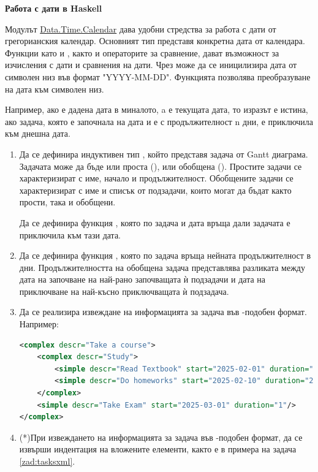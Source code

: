 \begin{mdframed}[hidealllines=true,backgroundcolor=gray!20]
\textbf{Работа с дати в Haskell}

Модулът \href{https://hackage.haskell.org/package/time-1.14/docs/Data-Time-Calendar.html}{Data.Time.Calendar} дава удобни стредства за работа с дати от грегорианския календар. Основният тип  представя конкретна дата от календара. Функции като  и , както и операторите за сравнение, дават възможност за изчисления с дати и сравнения на дати. Чрез  може да се иницилизира дата от символен низ във формат "YYYY-MM-DD". Функцията  позволява преобразуване на дата към символен низ.


Например, ако  е дадена дата в миналото, a  е текущата дата, то изразът  е истина, ако задача, която е започнала на дата  и е с продължителност n дни, е приключила към днешна дата.

\end{mdframed}

\begin{enumerate}[]
	\item Да се дефинира индуктивен тип , който представя задача от Gantt диаграма. Задачата може да бъде или проста (), или обобщена (). Простите задачи се характеризират с име, начало и продължителност. Обобщените задачи се характеризират с име и списък от подзадачи, които могат да бъдат както прости, така и обобщени. 
	
	Да се дефинира функция , която по задача и дата връща дали задачата е приключила към тази дата. 

	\item Да се дефинира функция , която по задача връща нейната продължителност в дни. Продължителността на обобщена задача представлява разликата между дата на започване на най-рано започващата ѝ подзадачи и дата на приключване на най-късно приключващата ѝ подзадача. 
	
	\item \label{zad:tasksxml} Да се реализира извеждане на информацията за задача във -подобен формат. Например:
\begin{lstlisting}[basicstyle=\tiny,language=xml]
<complex descr="Take a course">
	<complex descr="Study">
		<simple descr="Read Textbook" start="2025-02-01" duration="20"/>
		<simple descr="Do homeworks" start="2025-02-10" duration="20"/>
	</complex>
	<simple descr="Take Exam" start="2025-03-01" duration="1"/>
</complex>
\end{lstlisting}

	\item(*)При извеждането на информацията за задача във -подобен формат, да се извърши индентация на вложените елементи, както е в примера на задача \ref{zad:tasksxml}.
	

\end{enumerate}


